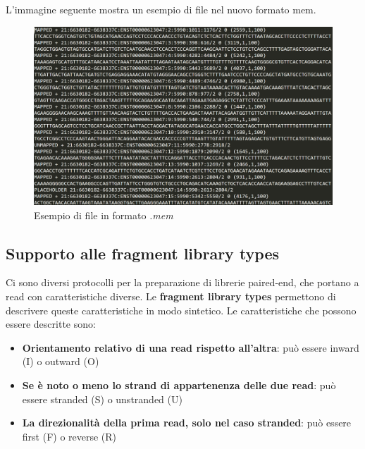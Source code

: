 L'immagine seguente mostra un esempio di file nel nuovo formato mem.

\begin{figure}[h!]
	\centering
	\includegraphics[width=\linewidth]{images/tipiMEM3.png}
  \caption{Esempio di file in formato \textit{.mem}}
  \label{fig:MEMTypes}
\end{figure}

\newpage

\subsection{Supporto alle fragment library types}
Ci sono diversi protocolli per la preparazione di librerie paired-end, che portano a read con caratteristiche diverse. Le \textbf{fragment library types} permettono di descrivere queste caratteristiche in modo sintetico. Le caratteristiche che possono essere descritte sono:
\begin{itemize}
	\item \textbf{Orientamento relativo di una read rispetto all'altra}: può essere inward (I) o outward (O)
	\item \textbf{Se è noto o meno lo strand di appartenenza delle due read}:  può essere stranded (S) o unstranded (U)
	\item \textbf{La direzionalità della prima read, solo nel caso stranded}: può essere first (F) o reverse (R)
\end{itemize}

